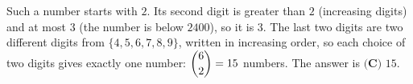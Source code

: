 Such a number starts with $2$. Its second digit is greater than $2$ (increasing digits) and at most $3$ (the number is below $2400$), so it is $3$. The last two digits are two different digits from $\{4,5,6,7,8,9\}$, written in increasing order, so each choice of two digits gives exactly one number: $\dbinom62=15$ numbers. The answer is $\boxed{\textbf{(C) }15}$.
